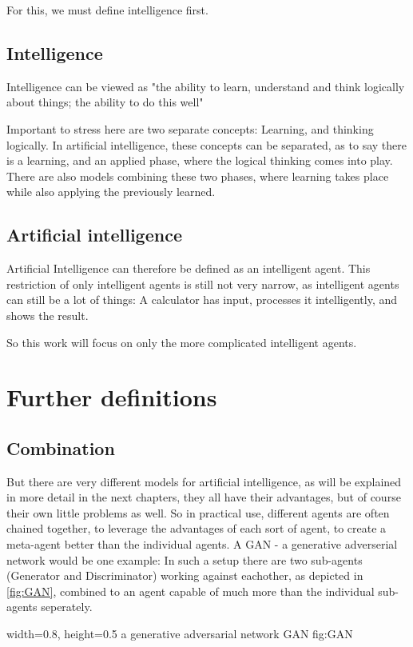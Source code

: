 For this, we must define intelligence first.
\subsection{Intelligence}
Intelligence can be viewed as "the ability to learn, understand and think logically about things; the ability to do this well" 
\cite{intelligence}

Important to stress here are two separate concepts: Learning, and thinking logically.
In artificial intelligence, these concepts can be separated, as to say there is a learning, and an applied phase, where the logical thinking comes into play. %
There are also models combining these two phases, where learning takes place while also applying the previously learned. 


\subsection{Artificial intelligence}
Artificial Intelligence can therefore be defined as an intelligent agent.
This restriction of only intelligent agents is still not very narrow, as intelligent agents can still be a lot of things: A calculator has input, processes it intelligently, and shows the result.

So this work will focus on only the more complicated intelligent agents.
\section{Further definitions}
\subsection{Combination}
But there are very different models for artificial intelligence, as will be explained in more detail in the next chapters, they all have their advantages, but of course their own little problems as well. So in practical use, different agents are often chained together, to leverage the advantages of each sort of agent, to create a meta-agent better than the individual agents.
A GAN - a generative adverserial network would be one example: In such a setup there are two sub-agents (Generator and Discriminator) working against eachother, as depicted in \ref{fig:GAN}, combined to an agent capable of much more than the individual sub-agents seperately.

    {width=0.8\textwidth, height=0.5\textheight} %
    {a generative adversarial network}   %
    {GAN}   %
    {fig:GAN}    %


